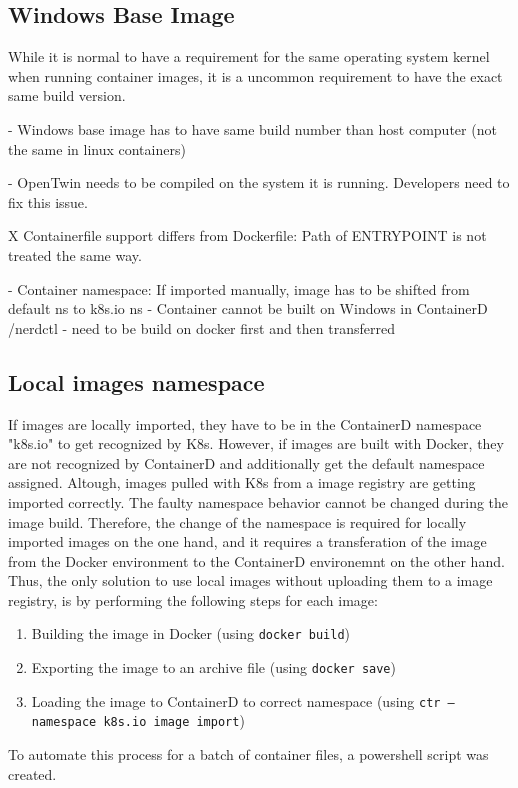 \subsection{Windows Base Image}
While it is normal to have a requirement for the same operating system kernel when running container images, it is a uncommon requirement to have the exact same build version.

- Windows base image has to have same build number than host computer (not the same in linux containers)

- OpenTwin needs to be compiled on the system it is running. Developers need to fix this issue.




X Containerfile support differs from Dockerfile: Path of ENTRYPOINT is not treated the same way.


- Container namespace: If imported manually, image has to be shifted from default ns to k8s.io ns
	- Container cannot be built on Windows in ContainerD /nerdctl - need to be build on docker first and then transferred

\subsection{Local images namespace}
If images are locally imported, they have to be in the ContainerD namespace "k8s.io" to get recognized by \ac{K8s}. However, if images are built with Docker, they are not recognized by ContainerD and additionally get the default namespace assigned. Altough, images pulled with \ac{K8s} from a image registry are getting imported correctly. The faulty namespace behavior cannot be changed during the image build.  Therefore, the change of the namespace is required for locally imported images on the one hand, and it requires a transferation of the image from the Docker environment to the ContainerD environemnt on the other hand.
Thus, the only solution to use local images without uploading them to a image registry, is by performing the following steps for each image:
\begin{enumerate}
	\item Building the image in Docker (using \texttt{docker build})
	\item Exporting the image to an archive file (using \texttt{docker save})
	\item Loading the image to ContainerD to correct namespace (using \texttt{ctr --namespace k8s.io image import})
\end{enumerate}
To automate this process for a batch of container files, a powershell script was created.



